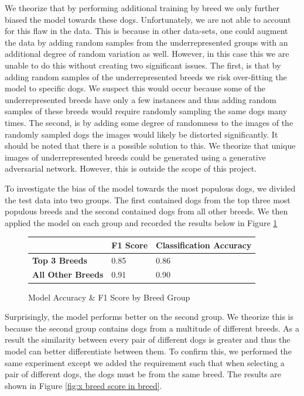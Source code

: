 \documentclass{article}
\begin{document}
We theorize that by performing additional training by breed we only further biased the model towards these dogs.  Unfortunately, we are not able to account for this flaw in the data.  This is because in other data-sets, one could augment the data by adding random samples from the underrepresented groups with an additional degree of random variation as well.  However, in this case this we are unable to do this without creating two significant issues.  The first, is that by adding random samples of the underrepresented breeds we risk over-fitting the model to specific dogs.  We suspect this would occur because some of the underrepresented breeds have only a few instances and thus adding random samples of these breeds would require randomly sampling the same dogs many times.  The second, is by adding some degree of randomness to the images of the randomly sampled dogs the images would likely be distorted significantly.  It should be noted that there is a possible solution to this.  We theorize that unique images of underrepresented breeds could be generated using a generative adversarial network.  However, this is outside the scope of this project.

To investigate the bias of the model towards the most populous dogs, we divided the test data into two groups.  The first contained dogs from the top three most populous breeds and the second contained dogs from all other breeds.  We then applied the model on each group and recorded the results below in Figure \ref{fig:x breed score}


\begin{figure}[]

\begin{center}

\begin{tabular}{|l|l|l|}
\hline
                          & \textbf{F1 Score} & \textbf{Classification Accuracy} \\ \hline
\textbf{Top 3 Breeds}     & 0.85        & 0.86              \\ \hline
\textbf{All Other Breeds} & 0.91        & 0.90              \\ \hline
\end{tabular}
\end{center}


\caption{Model Accuracy \& F1 Score by Breed Group}
\label{fig:x breed score}
\end{figure}

\noindent Surprisingly, the model performs better on the second group.  We theorize this is because the second group contains dogs from a multitude of different breeds.   As a result the similarity between every pair of different dogs is greater and thus the model can better differentiate between them.  To confirm this, we performed the same experiment except we added the requirement such that when selecting a pair of different dogs, the dogs must be from the same breed.  The results are shown in Figure \ref{fig:x breed score in breed}.
\end{document}
